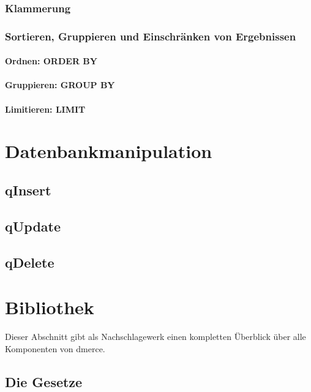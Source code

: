 \subsection{Klammerung}

\subsection{Sortieren, Gruppieren und Einschr\"anken von Ergebnissen}
\subsubsection{Ordnen: ORDER BY}
\subsubsection{Gruppieren: GROUP BY}
\subsubsection{Limitieren: LIMIT}

\chapter{Datenbankmanipulation}

\section{qInsert}
\label{qInsert}
\label{MultipleInsert}

\section{qUpdate}
\label{qUpdate}
\label{MultipleUpdate}

\section{qDelete}
\label{qDelete}
\label{MultipleDelete}

\chapter{Bibliothek}

Dieser Abschnitt gibt als Nachschlagewerk einen kompletten \"Uberblick
\"uber alle Komponenten von dmerce.

\newpage
\section{Die Gesetze}

